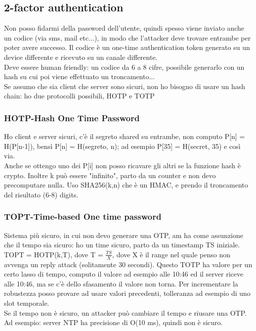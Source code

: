 \documentclass[16px]{article}
\begin{document}
\subsection{2-factor authentication}
Non posso fidarmi della password dell'utente, quindi spesso viene inviato anche un codice (via sms, mail etc...), in modo che l'attacker deve trovare entrambe per poter avere successo. Il codice è un one-time authentication token generato su un device differente e ricevuto su un canale differente.\\ Deve essere human friendly: un codice da 6 a 8 cifre, possibile generarlo con un hash su cui poi viene effettuato un troncamento...\\ Se assumo che sia client che server sono sicuri, non ho bisogno di usare un hash chain: ho due protocolli possibili, HOTP e TOTP
\subsubsection{HOTP-Hash One Time Password}
Ho client e server sicuri, c'è il segreto shared su entrambe, non computo P[n] = H(P[n-1]), bensì P[n] = H(segreto, n); ad esempio P[35] = H(secret, 35) e così via.\\ Anche se ottengo uno dei P[i] non posso ricavare gli altri se la funzione hash è crypto. Inoltre k può essere "infinito", parto da un counter e non devo precomputare nulla. Uso SHA256(k,n) che è un HMAC, e prendo il troncamento del risultato (6-8) digits.
\subsubsection{TOPT-Time-based One time password}
Sistema più sicuro, in cui non devo generare una OTP, am ha come assunzione che il tempo sia sicuro: ho un time sicuro, parto da un timestamp TS iniziale. TOPT = HOTP(k,T), dove T = $\frac{TS}{X}$, dove X è il range nel quale penso non avvenga un reply attack (solitamente 30 secondi). Questo TOTP ha valore per un certo lasso di tempo, computo il valore ad esempio alle 10:46 ed il server riceve alle 10:46, ma se c'è dello sfasamento il valore non torna. Per incrementare la robustezza posso provare ad usare valori precedenti, tolleranza ad esempio di uno slot temporale.\\ Se il tempo non è sicuro, un attacker può cambiare il tempo e riusare una OTP. Ad esempio: server NTP ha precisione di O(10 ms), quindi non è sicuro.
\end{document}
